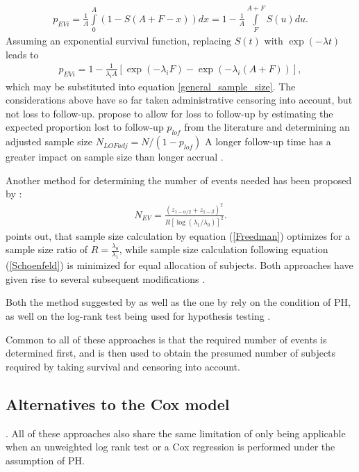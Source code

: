 \documentclass[main.tex]{subfiles}
\begin{document}
\begin{align}
p_{EVi} = \frac{1}{A}\int\limits^A_0(1-S(A+F-x))dx = 1-\frac{1}{A}\int\limits_F^{A+F}S(u)du.
\end{align}
Assuming an exponential survival function, replacing $S(t)$ with $\exp{(-\lambda t)}$ leads to
\begin{align}
p_{EVi} = 1-\frac{1}{\lambda_i A}\left[ \exp{(-\lambda_i F)}-\exp{(-\lambda_i(A+F))}\right],
\end{align}
which may be substituted into equation \ref{general_sample_size}.
The considerations above have so far taken administrative censoring into account, but not loss to follow-up. \textcite{kleinbaum2012survival} propose to allow for loss to follow-up by estimating the expected proportion lost to follow-up $p_{lof}$ from the literature and determining an adjusted sample size $N_{LOFadj}=N/(1-p_{lof})$
A longer follow-up time has a greater impact on sample size than longer accrual \parencite{kleinbaum2012survival}.

Another method for determining the number of events needed has been proposed by \textcite{schoenfeld1981asymptotic}:
\begin{align} \label{Schoenfeld}
N_{EV} = \frac{(z_{1-\alpha /2}+z_{1-\beta})^2}{R [\log(\lambda_1 / \lambda_0)]^2}.
\end{align}
\textcite{hsieh1992comparing} points out, that sample size calculation by equation (\ref{Freedman}) optimizes for a sample size ratio of $R = \frac{\lambda_0}{\lambda_1}$, while sample size calculation following equation (\ref{Schoenfeld}) is minimized for equal allocation of subjects. Both approaches have given rise to several subsequent modifications \parencite{hsieh1992comparing}.

Both the method suggested by \textcite{schoenfeld1981asymptotic} as well as the one by \textcite{freedman1982tables} rely on the condition of PH, as well on the log-rank test being used for hypothesis testing \parencite{Yung2020-ht}.

Common to all of these approaches is that the required number of events is determined first, and is then used to obtain the presumed number of subjects required by taking survival and censoring into account.
\subsection{Alternatives to the Cox model}. All of these approaches also share the same limitation of only being applicable when an unweighted log rank test or a Cox regression is performed under the assumption of PH.
\end{document}
